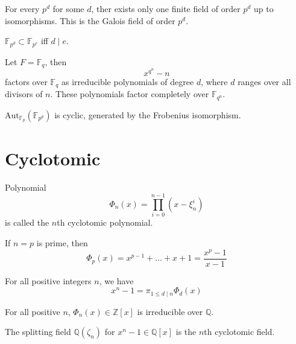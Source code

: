 \documentclass[openany]{book}
\newcommand{\Z}{\mathbb{Z}}
\newcommand{\F}{\mathbb{F}}
\newcommand{\Q}{\mathbb{Q}}
\begin{document}
\begin{cor}
    For every $p^d$ for some $d$, ther exists only one finite field of order $p^d$ up to isomorphisms. This is the Galois field of order $p^d$.
\end{cor}



\begin{cor}
    $\F_{p^d}\subset\F_{p^e}$ iff $d\mid e$.
\end{cor}

\begin{cor}
    Let $F=\F_q$, then 
    \begin{equation*}
        x^{q^n}-n
    \end{equation*}
    factors over $\F_q$ as irreducible polynomials of degree $d$, where $d$ ranges over all divisors of $n$. These polynomials factor completely over $\F_{q^n}$.
\end{cor}

\begin{thm}
    $\text{Aut}_{\F_p}(\F_{p^d})$ is cyclic, generated by the Frobenius isomorphism.
\end{thm}

\section{Cyclotomic}
\begin{defn}
    Polynomial 
    \begin{equation*}
        \Phi_n(x)=\prod_{i=0}^{n-1}(x-\xi_n^i)
    \end{equation*}
    is called the $n$th cyclotomic polynomial.
\end{defn}

\begin{prop}
    If $n=p$ is prime, then 
    \begin{equation*}
        \Phi_p(x)=x^{p-1}+\dots+x+1=\frac{x^p-1}{x-1}
    \end{equation*}

    For all positive integers $n$, we have 
    \begin{equation*}
        x^n-1=\pi_{1\leq d\mid n}\Phi_d(x)
    \end{equation*}
\end{prop}


\begin{prop}
    For all positive $n$, $\Phi_n(x)\in\Z[x]$ is irreducible over $\Q$.
\end{prop}

\begin{defn}
    The splitting field $\Q(\zeta_n)$  for $x^n-1\in\Q[x]$  is the $n$th cyclotomic field. 
\end{defn}
\end{document}
